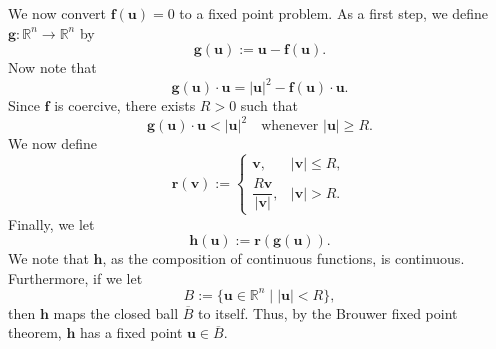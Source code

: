 \begin{Proof}
We now convert $\bm{f}(\bm{u})=0$ to a fixed point problem. As a first step, we define $\bm{g}:\mathbb{R}^n\to\mathbb{R}^n$ by
\begin{equation}\label{eq:coercive-surjectivity-fixed-point-mapping}
\bm{g}(\bm{u}):=\bm{u}-\bm{f}(\bm{u}).
\end{equation}
Now note that
\begin{equation}\label{eq:coercive-surjectivity-fixed-point-pairing}
\bm{g}(\bm{u})\cdot\bm{u}=|\bm{u}|^2-\bm{f}(\bm{u})\cdot\bm{u}.
\end{equation}
Since $\bm{f}$ is coercive, there exists $R>0$ such that
\begin{equation}\label{eq:coercive-surjectivity-large-radius-strict-bound}
\bm{g}(\bm{u})\cdot\bm{u}<|\bm{u}|^2\quad\text{whenever }|\bm{u}|\geq R.
\end{equation}
We now define
\begin{equation}\label{eq:coercive-surjectivity-ball-retraction}
\bm{r}(\bm{v}):=\begin{cases}\bm{v},&|\bm{v}|\leq R,\\\dfrac{R\bm{v}}{|\bm{v}|},&|\bm{v}|>R.\end{cases}
\end{equation}
Finally, we let
\begin{equation}\label{eq:coercive-surjectivity-retracted-fixed-point-mapping}
\bm{h}(\bm{u}):=\bm{r}(\bm{g}(\bm{u})).
\end{equation}
We note that $\bm{h}$, as the composition of continuous functions, is continuous. Furthermore, if we let
\begin{equation}\label{eq:coercive-surjectivity-open-ball}
B:=\{\bm{u}\in\mathbb{R}^n\mid|\bm{u}|<R\},
\end{equation}
then $\bm{h}$ maps the closed ball $\overline B$ to itself. Thus, by the Brouwer fixed point theorem, $\bm{h}$ has a fixed point $\bm{u}\in\overline B$.


\end{Proof}
